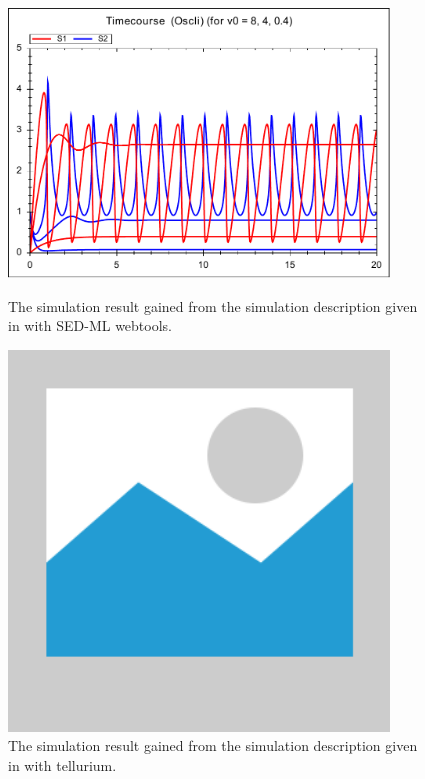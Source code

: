 \begin{figure}
    \centering
    \begin{minipage}{0.45\textwidth}
        \centering
        \includegraphics[width=0.9\textwidth]{examples/repeated-scan-oscli/results/repeated-scan-oscli}
        \caption{The simulation result gained from the simulation description given in  with SED-ML webtools.}
    \end{minipage}\hfill
    \begin{minipage}{0.45\textwidth}
        \centering
        \includegraphics[width=0.9\textwidth]{examples/placeholder}
        \caption{The simulation result gained from the simulation description given in  with tellurium.}
    \end{minipage}
    \label{fig:repeated-scan-oscli}
\end{figure}

